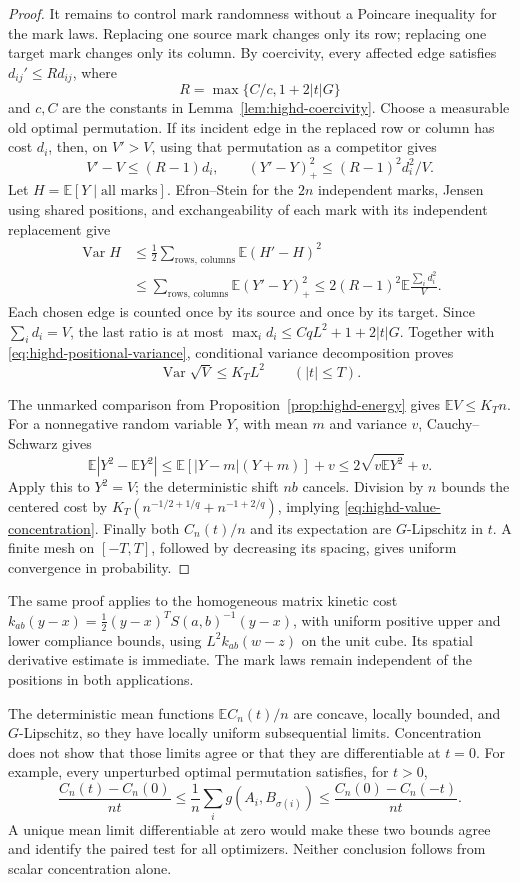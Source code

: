 \documentclass[11pt,reqno]{amsart}
\theoremstyle{definition}
\theoremstyle{remark}
\numberwithin{equation}{section}
\newcommand{\E}{\mathbb E}
\begin{document}
\begin{proof}
It remains to control mark randomness without a Poincare inequality
for the mark laws. Replacing one source mark changes only its row;
replacing one target mark changes only its column. By coercivity,
every affected edge satisfies \(d_{ij}'\le R d_{ij}\), where
\[
R=\max\{C/c,1+2|t|G\}
\]
and \(c,C\) are the constants in
Lemma~\ref{lem:highd-coercivity}. Choose a measurable old optimal
permutation. If its incident edge in the replaced row or column
has cost \(d_i\), then, on \(V'>V\), using that permutation
as a competitor gives
\[
V'-V\le(R-1)d_i,
\qquad (Y'-Y)_+^2\le(R-1)^2d_i^2/V.
\]
Let \(H=\E[Y\mid\text{all marks}]\). Efron--Stein for the
\(2n\) independent marks, Jensen using shared positions, and
exchangeability of each mark with its independent replacement give
\[
\begin{split}
\operatorname{Var}H
&\le\frac12\sum_{\text{rows, columns}}\E(H'-H)^2\\
&\le\sum_{\text{rows, columns}}\E(Y'-Y)_+^2
 \le2(R-1)^2\E\frac{\sum_i d_i^2}{V}.
\end{split}
\]
Each chosen edge is counted once by its source and once by its
target. Since \(\sum_i d_i=V\), the last ratio is at most
\(\max_i d_i\le CqL^2+1+2|t|G\).
Together with \eqref{eq:highd-positional-variance}, conditional
variance decomposition proves
\[
\operatorname{Var}\sqrt V\le K_T L^2
\qquad(|t|\le T).
\]

The unmarked comparison from Proposition~\ref{prop:highd-energy}
gives \(\E V\le K_T n\). For a nonnegative random variable
\(Y\), with mean \(m\) and variance \(v\), Cauchy--Schwarz gives
\[
\E|Y^2-\E Y^2|
 \le\E[|Y-m|(Y+m)]+v
 \le2\sqrt{v\E Y^2}+v.
\]
Apply this to \(Y^2=V\); the deterministic shift \(nb\)
cancels. Division by \(n\) bounds the centered cost by
\(K_T(n^{-1/2+1/q}+n^{-1+2/q})\), implying
\eqref{eq:highd-value-concentration}. Finally both
\(C_n(t)/n\) and its expectation are \(G\)-Lipschitz in
\(t\). A finite mesh on \([-T,T]\), followed by decreasing
its spacing, gives uniform convergence in probability.
\end{proof}

The same proof applies to the homogeneous matrix kinetic cost
\(k_{ab}(y-x)=\tfrac12(y-x)^TS(a,b)^{-1}(y-x)\),
with uniform positive upper and lower compliance bounds, using
\(L^2k_{ab}(w-z)\) on the unit cube. Its spatial derivative
estimate is immediate. The mark laws remain independent of the
positions in both applications.

The deterministic mean functions \(\E C_n(t)/n\) are concave,
locally bounded, and \(G\)-Lipschitz, so they have locally uniform
subsequential limits. Concentration does not show that those limits
agree or that they are differentiable at \(t=0\). For example,
every unperturbed optimal permutation satisfies, for \(t>0\),
\[
\frac{C_n(t)-C_n(0)}{nt}
\le\frac1n\sum_i g(A_i,B_{\sigma(i)})
\le\frac{C_n(0)-C_n(-t)}{nt}.
\]
A unique mean limit differentiable at zero would make these two
bounds agree and identify the paired test for all optimizers.
Neither conclusion follows from scalar concentration alone.
\end{document}
